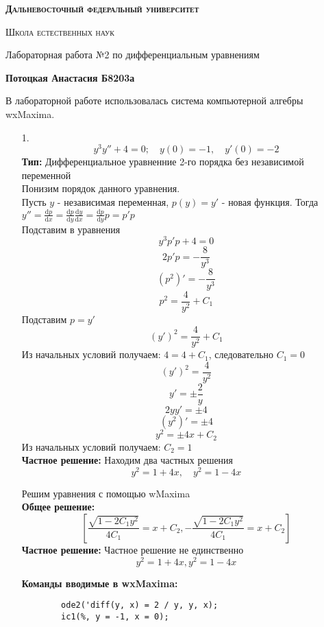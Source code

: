 \documentclass[a4paper, 12pt, oneside]{scrartcl}
\begin{document}
	\begin{center}
	{\scshape\Large\bfseries Дальневосточный федеральный университет \par}
	{\scshape\Large Школа естественных наук \par}
	{\large Лабораторная работа №2 по дифференциальным уравнениям \par}
	{\large\bfseries Потоцкая Анастасия Б8203а \par}
	\end{center}
	\newcommand{\ud}{\mathrm{d}}
	В лабораторной работе использовалась система компьютерной алгебры wxMaxima. 
		\begin{enumerate}

		\item[1.] 
		$$y^3y''+ 4 = 0; \quad y(0)=-1, \quad y'(0)=-2$$
		\textbf{Тип: }
		Дифференциальное уравненние 2-го порядка без независимой переменной \\
		Понизим порядок данного уравнения. \\
		Пусть $y$ - независимая переменная, $p(y) = y'$ - новая функция. Тогда $y'' = \frac{\ud p}{\ud x} = \frac{\ud p}{\ud y} \frac{\ud y}{\ud x} = \frac{\ud p}{\ud y}p = p'p$ \\ 
		Подставим в уравнения \\
		$$ y^3p'p + 4 = 0 $$ 
		$$ 2p'p = -\frac{8}{y^{3}} $$ 
		$$ (p^2)' = -\frac{8}{y^{3}} $$ 
		$$ p^2 = \frac{4}{y^{2}} + C_1 $$ 
		Подставим $p = y'$ \\
		$$ (y')^2 = \frac{4}{y^{2}} + C_1 $$ 
		Из начальных условий получаем: $ 4 = 4 + C_1 $, следовательно $ C_1 = 0 $ \\
		$$ (y')^2 = \frac{4}{y^{2}} $$
		$$ y' = \pm \frac{2}{y}$$ 
		$$ 2yy' = \pm 4 $$ 
		$$ (y^2)' = \pm 4 $$ 
		$$ y^2 = \pm 4x + C_2 $$ 
		Из начальных условий получаем: $ C_2 = 1 $ \\

		\textbf{Частное решение: }
		Находим два частных решения \\ 
		$$ y^2 = 1 + 4x, \quad y^2 = 1 - 4x $$
		
		Решим уравнения с помощью wMaxima \\
		\textbf{Общее решение: }
		$$[ \frac{\sqrt{1 - 2C_{1}y^2} }{4C_{1}} = x + C_{2}, -\frac{\sqrt{1 - 2C_{1}y^2}}{4C_{1}} = x + C_{2}] $$
		\textbf{Частное решение: }
		Частное решение не единственно \\ 
		$$ y^2 = 1 + 4x, y^2 = 1 - 4x $$

		\textbf{Команды вводимые в wxMaxima: }
		\begin{verbatim}
		ode2('diff(y, x) = 2 / y, y, x);
		ic1(%, y = -1, x = 0);
		

\end{verbatim}
\end{enumerate}
\end{document}
